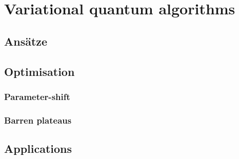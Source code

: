 \chapter{Variational quantum algorithms}
\label{sec:vqa}

\section{Ansätze}

\section{Optimisation}
\subsection{Parameter-shift}
\subsection{Barren plateaus}

\section{Applications}